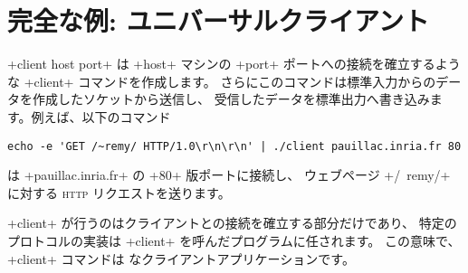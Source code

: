\section{\label{sec/univclient}完全な例: ユニバーサルクライアント}

\ml+client host port+ は \ml+host+ マシンの \ml+port+ ポートへの接続を確立するような \ml+client+
コマンドを作成します。
さらにこのコマンドは標準入力からのデータを作成したソケットから送信し、
受信したデータを標準出力へ書き込みます。例えば、以下のコマンド
\begin{lstlisting}
echo -e 'GET /~remy/ HTTP/1.0\r\n\r\n' | ./client pauillac.inria.fr 80
\end{lstlisting}
は \ml+pauillac.inria.fr+ の \ml+80+ 版ポートに接続し、
ウェブページ \ml+/~remy/+ に対する \textsc{http} リクエストを送ります。

\ml+client+ が行うのはクライアントとの接続を確立する部分だけであり、
特定のプロトコルの実装は \ml+client+ を呼んだプログラムに任されます。
この意味で、 \ml+client+ コマンドは  なクライアントアプリケーションです。

